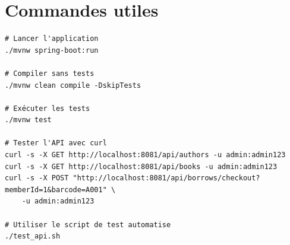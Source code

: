 \documentclass[12pt,a4paper,twoside]{report}
\begin{document}
\section{Commandes utiles}

\begin{lstlisting}[caption=Commandes pour lancer et tester l'application]
# Lancer l'application
./mvnw spring-boot:run

# Compiler sans tests
./mvnw clean compile -DskipTests

# Exécuter les tests
./mvnw test

# Tester l'API avec curl
curl -s -X GET http://localhost:8081/api/authors -u admin:admin123
curl -s -X GET http://localhost:8081/api/books -u admin:admin123
curl -s -X POST "http://localhost:8081/api/borrows/checkout?memberId=1&barcode=A001" \
    -u admin:admin123

# Utiliser le script de test automatise
./test_api.sh
\end{lstlisting}
\end{document}
